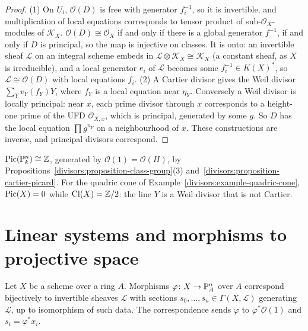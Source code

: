 \begin{proof}
(1) On $U_i$, $\mathcal{O}(D)$ is free with generator $f_i^{-1}$, so it is invertible, and multiplication of local equations corresponds to tensor product of
sub-$\mathcal{O}_X$-modules of $\mathcal{K}_X$. $\mathcal{O}(D) \cong \mathcal{O}_X$ if and only if there is a global generator $f^{-1}$, if and only if $D$ is principal, so the map
is injective on classes. It is onto: an invertible sheaf $\mathcal{L}$ on an integral scheme embeds in $\mathcal{L} \otimes \mathcal{K}_X \cong \mathcal{K}_X$ (a constant sheaf, as
$X$ is irreducible), and a local generator $e_i$ of $\mathcal{L}$ becomes some $f_i^{-1} \in K(X)^*$, so $\mathcal{L} \cong \mathcal{O}(D)$ with local equations $f_i$.
(2) A Cartier divisor gives the Weil divisor $\sum_Yv_Y(f_Y)Y$, where $f_Y$ is a local equation near $\eta_Y$. Conversely a Weil divisor is locally principal:
near $x$, each prime divisor through $x$ corresponds to a height-one prime of the UFD $\mathcal{O}_{X,x}$, which is principal, generated by some $g$. So $D$ has
the local equation $\prod g^{n_Y}$ on a neighbourhood of $x$. These constructions are inverse, and principal divisors correspond.
\end{proof}

\begin{example}\label{divisors:example-picard-projective}
$\operatorname{Pic}(\mathbb{P}^n_k) \cong \mathbb{Z}$, generated by $\mathcal{O}(1) = \mathcal{O}(H)$, by Propositions~\ref{divisors:proposition-class-group}(3) and~\ref{divisors:proposition-cartier-picard}.
For the quadric cone of Example~\ref{divisors:example-quadric-cone}, $\operatorname{Pic}(X) = 0$ while $\mathrm{Cl}(X) = \mathbb{Z}/2$: the line $Y$ is a Weil divisor that is not Cartier.
\end{example}

\section{Linear systems and morphisms to projective space}\label{divisors:section-linear-systems}

\begin{proposition}\label{divisors:proposition-morphisms-projective}
Let $X$ be a scheme over a ring $A$. Morphisms $\varphi \colon X \to \mathbb{P}^n_A$ over $A$ correspond bijectively to invertible sheaves $\mathcal{L}$ with sections
$s_0, \ldots, s_n \in \Gamma(X, \mathcal{L})$ generating $\mathcal{L}$, up to isomorphism of such data. The correspondence sends $\varphi$ to $\varphi^*\mathcal{O}(1)$ and
$s_i = \varphi^*x_i$.
\end{proposition}

